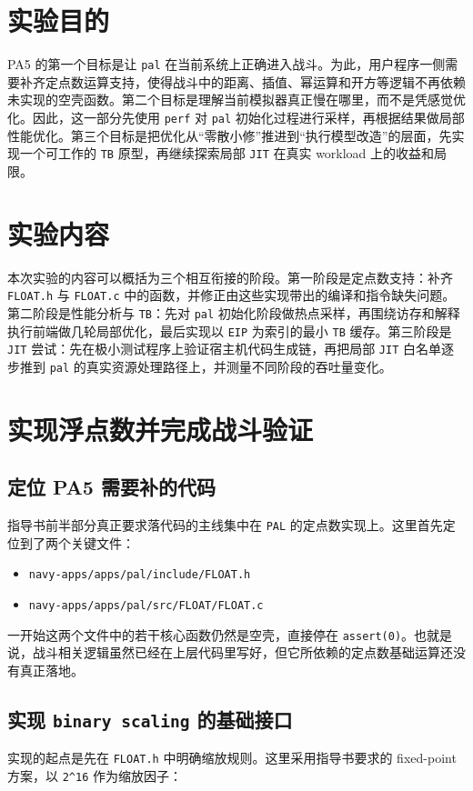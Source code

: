 \documentclass[a4paper]{article}
\begin{document}
\section{实验目的}
PA5 的第一个目标是让 \texttt{pal} 在当前系统上正确进入战斗。为此，用户程序一侧需要补齐定点数运算支持，使得战斗中的距离、插值、幂运算和开方等逻辑不再依赖未实现的空壳函数。第二个目标是理解当前模拟器真正慢在哪里，而不是凭感觉优化。因此，这一部分先使用 \texttt{perf} 对 \texttt{pal} 初始化过程进行采样，再根据结果做局部性能优化。第三个目标是把优化从“零散小修”推进到“执行模型改造”的层面，先实现一个可工作的 \texttt{TB} 原型，再继续探索局部 \texttt{JIT} 在真实 workload 上的收益和局限。

\section{实验内容}
本次实验的内容可以概括为三个相互衔接的阶段。第一阶段是定点数支持：补齐 \texttt{FLOAT.h} 与 \texttt{FLOAT.c} 中的函数，并修正由这些实现带出的编译和指令缺失问题。第二阶段是性能分析与 \texttt{TB}：先对 \texttt{pal} 初始化阶段做热点采样，再围绕访存和解释执行前端做几轮局部优化，最后实现以 \texttt{EIP} 为索引的最小 \texttt{TB} 缓存。第三阶段是 \texttt{JIT} 尝试：先在极小测试程序上验证宿主机代码生成链，再把局部 \texttt{JIT} 白名单逐步推到 \texttt{pal} 的真实资源处理路径上，并测量不同阶段的吞吐量变化。

\section{实现浮点数并完成战斗验证}

\subsection{定位 PA5 需要补的代码}
指导书前半部分真正要求落代码的主线集中在 \texttt{PAL} 的定点数实现上。这里首先定位到了两个关键文件：

\begin{itemize}
  \item \texttt{navy-apps/apps/pal/include/FLOAT.h}
  \item \texttt{navy-apps/apps/pal/src/FLOAT/FLOAT.c}
\end{itemize}

一开始这两个文件中的若干核心函数仍然是空壳，直接停在 \texttt{assert(0)}。也就是说，战斗相关逻辑虽然已经在上层代码里写好，但它所依赖的定点数基础运算还没有真正落地。

\subsection{实现 \texttt{binary scaling} 的基础接口}
实现的起点是先在 \texttt{FLOAT.h} 中明确缩放规则。这里采用指导书要求的 fixed-point 方案，以 \texttt{2\^{}16} 作为缩放因子：
\end{document}
